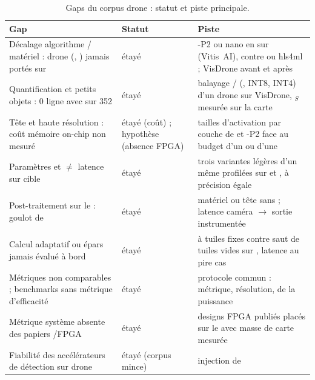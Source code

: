 \begin{table}[!htbp]
\centering\footnotesize
\caption{Gaps du corpus drone : statut et piste principale.}
\label{tab:gaps}
\begin{tabularx}{\textwidth}{@{}P{4.3cm}P{1.8cm}L@{}}
\toprule
Gap & Statut & Piste \\
\midrule
Décalage algorithme / matériel :  drone (, ) jamais portés sur  & étayé &
  -P2 ou  nano en  sur  (Vitis~AI), contre  ou hls4ml ; 
  VisDrone avant et après \\
Quantification et petits objets : 0 ligne avec  sur 352 & étayé & balayage  / 
  (, INT8, INT4) d'un  drone sur VisDrone, $_S$ mesurée sur la carte \\
Tête  et haute résolution : coût mémoire on-chip non mesuré & étayé (coût) ; hypothèse
  (absence FPGA) & tailles d'activation par couche de  et -P2 face au budget
   d'un  ou d'une  \\
Paramètres et  $\neq$ latence sur cible & étayé & trois variantes légères d'un même
   profilées sur  et , à précision égale \\
Post-traitement sur le  : goulot de  & étayé &  matériel ou tête sans  ;
  latence caméra $\rightarrow$ sortie instrumentée \\
Calcul adaptatif ou épars jamais évalué à bord & étayé &  à tuiles fixes contre saut de
  tuiles vides sur , latence au pire cas \\
Métriques non comparables ; benchmarks sans métrique d'efficacité & étayé & protocole
  commun : métrique, résolution,  de la puissance \\
Métrique système absente des papiers /FPGA & étayé & designs FPGA publiés placés sur le
   avec masse de carte mesurée \\
Fiabilité des accélérateurs de détection sur drone & étayé (corpus mince) & injection de

\end{tabularx}
\end{table}
